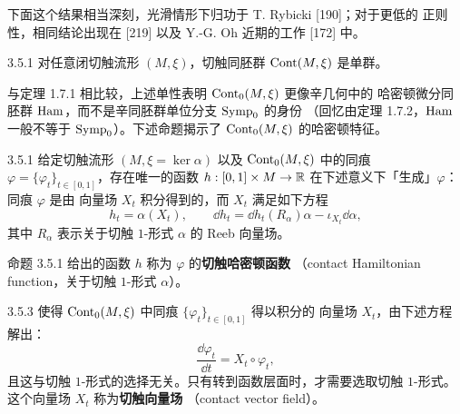 下面这个结果相当深刻，光滑情形下归功于 T. Rybicki [190]；对于更低的
正则性，相同结论出现在 [219] 以及 Y.-G. Oh 近期的工作 [172] 中。

\begin{wthm}{3.5.1}
对任意闭切触流形 $(M,\xi)$，切触同胚群 $\operatorname{Cont}(M,\xi)$ 是单群。
\end{wthm}


与定理 1.7.1 相比较，上述单性表明 $\operatorname{Cont}_0(M,\xi)$ 更像辛几何中的
哈密顿微分同胚群 $\operatorname{Ham}$，而不是辛同胚群单位分支 $\operatorname{Symp}_0$ 的身份
（回忆由定理 1.7.2，$\operatorname{Ham}$ 一般不等于 $\operatorname{Symp}_0$）。下述命题揭示了
$\operatorname{Cont}_0(M,\xi)$ 的哈密顿特征。

\begin{wprop}{3.5.1}
给定切触流形 $(M,\xi=\ker\alpha)$ 以及
$\operatorname{Cont}_0(M,\xi)$ 中的同痕
$\varphi=\{\varphi_t\}_{t\in[0,1]}$，存在唯一的函数
$h:[0,1]\times M\to\mathbb{R}$ 在下述意义下「生成」$\varphi$：同痕 $\varphi$ 是由
向量场 $X_t$ 积分得到的，而 $X_t$ 满足如下方程
\begin{equation}\tag{3.30}
  h_t=\alpha(X_t),\qquad
  \dd h_t=\dd h_t(R_\alpha)\alpha-\iota_{X_t}\dd\alpha,
\end{equation}
其中 $R_\alpha$ 表示关于切触 $1$-形式 $\alpha$ 的 Reeb 向量场。
\end{wprop}

命题 3.5.1 给出的函数 $h$ 称为 $\varphi$ 的\textbf{切触哈密顿函数}
（contact Hamiltonian function，关于切触 $1$-形式 $\alpha$）。

\begin{wrem}{3.5.3}
使得 $\operatorname{Cont}_0(M,\xi)$ 中同痕 $\{\varphi_t\}_{t\in[0,1]}$ 得以积分的
向量场 $X_t$，由下述方程解出：
\begin{equation}\tag{3.31}
  \frac{\dd\varphi_t}{\dd t}=X_t\circ\varphi_t,
\end{equation}
且这与切触 $1$-形式的选择无关。只有转到函数层面时，才需要选取切触
$1$-形式。这个向量场 $X_t$ 称为\textbf{切触向量场}
（contact vector field）。
\end{wrem}


